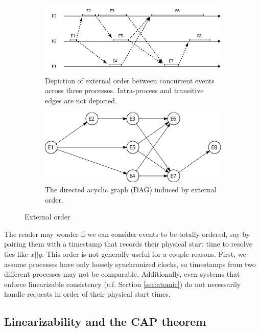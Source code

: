 \documentclass[]             %
{NASA}                       %
\theoremstyle{definition}
\begin{document}
\begin{figure}
     \begin{subfigure}[a]{1\textwidth}
         \center
         \includegraphics[scale=0.4]{images/externalorder.png}
         \caption{Depiction of external order between concurrent events across three processes. Intra-process and transitive edges are not depicted.}
         \label{fig:externalorderexec}
     \end{subfigure}
     \begin{subfigure}[b]{1\textwidth}
         \center
         \includegraphics[scale=0.25]{images/partialorder.png}
         \caption{The directed acyclic graph (DAG) induced by external order.}
         \label{fig:externalorderdag}
     \end{subfigure}
     \caption{External order}
     \label{fig:externalorder}
\end{figure}

The reader may wonder if we can consider events to be totally ordered,
say by pairing them with a timestamp that records their physical start
time to resolve ties like \(x || y\). This order is not generally useful
for a couple reasons. First, we assume processes have only loosely
synchronized clocks, so timestamps from two different processes may not
be comparable. Additionally, even systems that enforce linearizable
consistency (c.f. Section \ref{sec:atomic}) do not necessarily handle
requests in order of their physical start times.

\hypertarget{linearizability-and-the-cap-theorem}{%
\subsection{Linearizability and the CAP
theorem}\label{linearizability-and-the-cap-theorem}}
\end{document}
